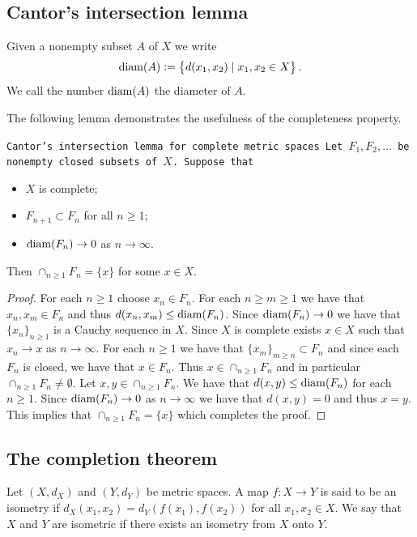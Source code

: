 \documentclass[11pt,a4paper]{article}
\begin{document}
\subsection{Cantor’s intersection lemma}

\begin{definition}[Diameter]
  Given a nonempty subset $A$ of $X$ we write
  \[
    \operatorname{diam}(A) := \left\{d(x_1,x_2) \mid x_1,x_2 \in X\right\}.
  \]
  We call the number $\operatorname{diam}(A)$ the diameter of $A$.
\end{definition}

The following lemma demonstrates the usefulness of the completeness property.

\begin{lemma}
  \tt{Cantor’s intersection lemma for complete metric spaces}
  Let $F_1,F_2,\dots$ be nonempty closed subsets of $X$. Suppose that
  \begin{itemize}
    \item $X$ is complete;
    \item $F_{n+1} \subset F_{n}$ for all $n \geq 1$;
    \item $\operatorname{diam}(F_n) \to 0$ as $n \to \infty$.
  \end{itemize}
  Then $\cap_{n \geq 1}{F_n} = \{x\}$ for some $x \in X$.
\end{lemma}
\begin{proof}
  For each $n \geq 1$ choose $x_n \in F_n$. For each $n \geq m \geq 1$
  we have that $x_n,x_m \in F_n$ and thus $d(x_n,x_m) \le \operatorname{diam}(F_n)$.
  Since $\operatorname{diam}(F_n) \to 0$ we have that $\{x_n\}_{n \geq 1}$ is a Cauchy
  sequence in $X$. Since $X$ is complete exists $x \in X$ such that
  $x_n \to x$ as $n \to \infty$. For each $n \geq 1$ we have that 
  $\{x_m\}_{m \geq n} \subset F_n$ and since each $F_n$ is closed, we
  have that $x \in F_n$. Thus $x \in \cap_{n \geq 1}{F_n}$ and in 
  particular $\cap_{n \geq 1}{F_n} \neq \emptyset$. Let 
  $x,y \in \cap_{n \geq 1}{F_n}$. We have that $d(x,y) \le \operatorname{diam}(F_n)$
  for each $n \geq 1$. Since $\operatorname{diam}(F_n) \to 0$ as $n \to \infty$ we
  have that $d(x,y) = 0$ and thus $x=y$. This implies that
  $\cap_{n \geq 1}{F_n} = \{x\}$ which completes the proof.
\end{proof}

\subsection{The completion theorem}

\begin{definition}[Isometry]
  Let $(X,d_X)$ and $(Y,d_Y)$ be metric spaces. A map $f \colon X \to Y$ 
  is said to be an isometry if $d_X(x_1,x_2) = d_Y(f(x_1),f(x_2))$ for all 
  $x_1,x_2 \in X$. We say that $X$ and $Y$ are isometric if there exists 
  an isometry from $X$ onto $Y$.
\end{definition}
\end{document}
